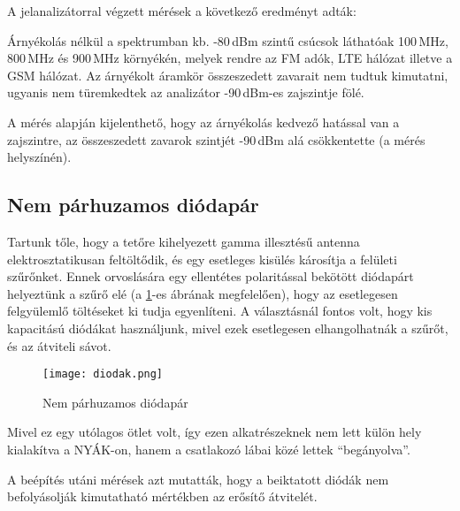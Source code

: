 A jelanalizátorral végzett mérések a következő eredményt adták:

Árnyékolás nélkül a spektrumban kb. -80\,dBm szintű csúcsok láthatóak 100\,MHz, 800\,MHz és 900\,MHz környékén, melyek rendre az FM adók, LTE hálózat illetve a GSM hálózat. Az árnyékolt áramkör összeszedett zavarait nem tudtuk kimutatni, ugyanis nem türemkedtek az analizátor -90\,dBm-es zajszintje fölé.

A mérés alapján kijelenthető, hogy az árnyékolás kedvező hatással van a zajszintre, az összeszedett zavarok szintjét -90\,dBm alá csökkentette (a mérés helyszínén).


\subsection{Nem párhuzamos diódapár}
\label{subsec:diodak}

Tartunk tőle, hogy a tetőre kihelyezett gamma illesztésű antenna elektrosztatikusan feltöltődik, és egy esetleges kisülés károsítja a felületi szűrőnket. Ennek orvoslására egy ellentétes polaritással bekötött diódapárt helyeztünk a szűrő elé (a \ref{fig:diodak}-es ábrának megfelelően), hogy az esetlegesen felgyülemlő töltéseket ki tudja egyenlíteni. A választásnál fontos volt, hogy kis kapacitású diódákat\cite{dioda} használjunk, mivel ezek esetlegesen elhangolhatnák a szűrőt, és az átviteli sávot.

\begin{figure}[!ht]
	\centering
	\texttt{[image: diodak.png]}
	\caption{Nem párhuzamos diódapár}
	\label{fig:diodak}
\end{figure}

Mivel ez egy utólagos ötlet volt, így ezen alkatrészeknek nem lett külön hely kialakítva a NYÁK-on, hanem a csatlakozó lábai közé lettek \enquote{begányolva}.

A beépítés utáni mérések azt mutatták, hogy a beiktatott diódák nem befolyásolják kimutatható mértékben az erősítő átvitelét.